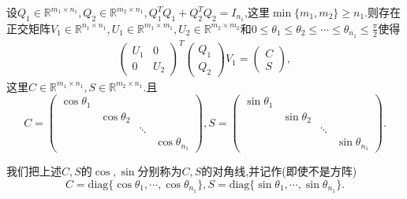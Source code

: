 \documentclass[../../main.tex]{subfiles}
\begin{document}
\begin{theorem}[CS分解]\label{theorem:CS分解}
设\( Q_1 \in \mathbb{R}^{m_1 \times n_1}, Q_2 \in \mathbb{R}^{m_2 \times n_1}, Q_1^T Q_1 + Q_2^T Q_2 = I_{n_1} \),这里\( \min\{m_1, m_2\} \geqslant  n_1 \).则存在正交矩阵\( V_1 \in \mathbb{R}^{n_1 \times n_1}, U_1 \in \mathbb{R}^{m_1 \times m_1}, U_2 \in \mathbb{R}^{m_2 \times m_2} \)和\( 0 \leqslant  \theta_1 \leqslant  \theta_2 \leqslant  \cdots \leqslant  \theta_{n_1} \leqslant  \frac{\pi}{2} \)使得
\begin{align}
\begin{pmatrix}
U_1 & 0 \\
0 & U_2
\end{pmatrix}^T \begin{pmatrix}
Q_1 \\
Q_2
\end{pmatrix} V_1 = \begin{pmatrix}
C \\
S
\end{pmatrix}, \label{eq:23.27182342343}
\end{align}
这里\( C \in \mathbb{R}^{m_1 \times n_1}, S \in \mathbb{R}^{m_2 \times n_1} \).且
\[
C = \begin{pmatrix}
\cos \theta_1 & & \\
& \cos \theta_2 & \\
& & \ddots \\
& & & \cos \theta_{n_1}
\end{pmatrix}, S = \begin{pmatrix}
\sin \theta_1 & & \\
& \sin \theta_2 & \\
& & \ddots \\
& & & \sin \theta_{n_1}
\end{pmatrix}.
\]
\end{theorem}
\begin{remark}
我们把上述\( C, S \)的\( \cos, \sin \)分别称为\( C, S \)的对角线,并记作(即使不是方阵)
\[
C = \text{diag}\{\cos \theta_1, \cdots, \cos \theta_{n_1}\}, S = \text{diag}\{\sin \theta_1, \cdots, \sin \theta_{n_1}\}.
\]
\end{remark}
\end{document}
